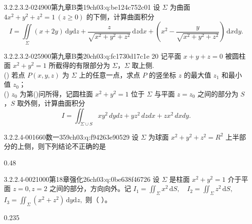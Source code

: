 \begin{q}{3.2.2.3.2-024}{900第九章B类19}{ch03:q:be124c752c01}
设 $\Sigma$ 为曲面 $4x^2+y^2+z^2=1\ (z\ge0)$ 的下侧，计算曲面积分 \[ I = \iint\limits_{\Sigma}(x+2y)\,\mathrm{d}y\mathrm{d}z + \frac{z}{\sqrt{x^2+y^2+z^2}}\,\mathrm{d}z\mathrm{d}x + \left(x^2-\frac{y}{\sqrt{x^2+y^2+z^2}}\right)\,\mathrm{d}x\mathrm{d}y. \]
\end{q}

\begin{q}{3.2.2.3.2-025}{900第九章B类20}{ch03:q:fc1730d17c1e}
20 记平面 $x+y+z=0$ 被圆柱面 $x^2+y^2=1$ 所截得的有限部分为 $\Sigma$，$\Sigma$ 取上侧.\\
() 若点 $P(x,y,z)$ 为 $\Sigma$ 上的任意一点，求点 $P$ 的竖坐标 $z$ 的最大值 $z_1$ 和最小值 $z_0$；\\
() $z_0$ 为第()问所得，记圆柱面 $x^2+y^2=1$ 位于 $\Sigma$ 与平面 $z=z_0$ 之间的部分为 $S$，$S$ 取外侧，计算曲面积分
\[
I=\iint_{\Sigma\cup S} xy^2\,dydz+yz^2\,dzdx+zx^2\,dxdy.
\]
\end{q}

\par\addvspace{2.4ex}\noindent
\begin{minipage}{\linewidth}

\begin{q}{3.2.2.4-001}{660数一359}{ch03:q:f94263e90529}
设 $\Sigma$ 为球面 $x^2+y^2+z^2=R^2$ 上半部分的上侧，则下列结论不正确的是
\begin{opts}{0.48}
\hfill{}\\[0.3ex]
\hfill{}
\end{opts}
\end{q}
\end{minipage}


\begin{q}{3.2.2.4-002}{1000第18章强化26}{ch03:q:0be638f46726}
设 $\Sigma$ 是柱面 $x^2+y^2=1$ 介于平面 $z=0,z=2$ 之间的部分，方向向外。记
$\displaystyle I_1=\iint_{\Sigma} x^2\,\mathrm{d}S,\quad I_2=\iint_{\Sigma} z^2\,\mathrm{d}S,$
$\displaystyle I_3=\iint_{\Sigma}(x^2+z^2)\,\mathrm{d}y\mathrm{d}z,$
则（ ）。
\begin{opts}{0.235}
\hfill{}\hfill{}\hfill{}
\end{opts}
\end{q}

